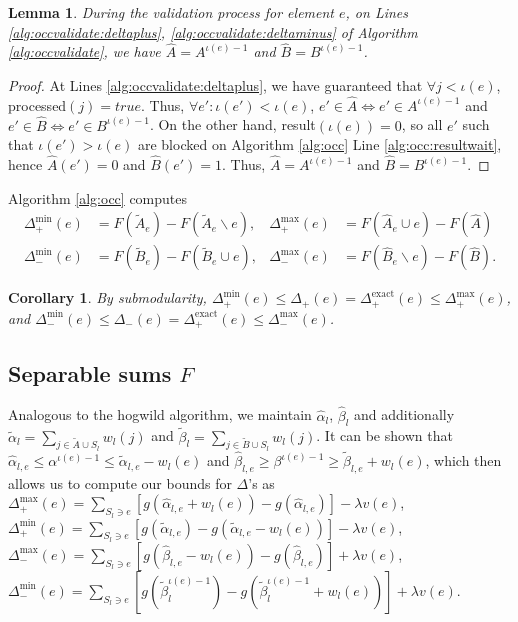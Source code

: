 \documentclass{article} %
\newtheorem{cor}[thm]{Corollary}
\newtheorem{lem}[thm]{Lemma}
\begin{document}
\begin{lem}
During the validation process for element $e$, on Lines \ref{alg:occvalidate:deltaplus}, \ref{alg:occvalidate:deltaminus} of Algorithm \ref{alg:occvalidate}, we have $\hat{A} = A^{\iota(e)-1}$ and $\hat{B} = B^{\iota(e)-1}$.
\end{lem}
\begin{proof}
At Lines \ref{alg:occvalidate:deltaplus}, we have guaranteed that $\forall j < \iota(e)$, processed$(j) = true$.
Thus, $\forall e': \iota(e') < \iota(e)$, $e' \in \hat{A} \iff e' \in A^{\iota(e)-1}$ and $e' \in \hat{B} \iff e' \in B^{\iota(e)-1}$.
On the other hand, result$(\iota(e)) = 0$, so all $e'$ such that $\iota(e') > \iota(e)$ are blocked on Algorithm \ref{alg:occ} Line \ref{alg:occ:resultwait}, hence $\hat{A}(e') = 0$ and $\hat{B}(e') = 1$.
Thus, $\hat{A} = A^{\iota(e)-1}$ and $\hat{B} = B^{\iota(e)-1}$.
\end{proof}

Algorithm \ref{alg:occ} computes
\begin{align*}
  \Delta_+^{\min}(e) &= F(\tilde{A}_e) - F(\tilde{A}_e \backslash e),
& \Delta_+^{\max}(e) &= F(\hat{A}_e \cup e) - F(\hat{A})\\
  \Delta_-^{\min}(e) &= F(\tilde{B}_e) - F(\tilde{B}_e \cup e),
& \Delta_-^{\max}(e) &= F(\hat{B}_e \backslash e) - F(\hat{B}).
\end{align*}

\begin{cor}\label{lem:occdeltas} By submodularity, $\Delta_+^{\min}(e) \leq \Delta_+(e) = \Delta_+^{\text{exact}}(e) \leq \Delta_+^{\max}(e)$, and $\Delta_-^{\min}(e) \leq \Delta_-(e) = \Delta_+^{\text{exact}}(e) \leq \Delta_-^{\max}(e)$.
\end{cor}

\subsection{Separable sums $F$}
Analogous to the hogwild algorithm, we maintain $\hat\alpha_l$, $\hat\beta_l$ and additionally $\tilde\alpha_l = \sum_{j\in \tilde{A}\cup S_l} w_l(j)$ and $\tilde\beta_l = \sum_{j \in \tilde{B}\cup S_l} w_l(j)$.
It can be shown that $\hat\alpha_{l,e} \leq \alpha^{\iota(e)-1} \leq \tilde\alpha_{l,e} - w_l(e)$ and $\hat\beta_{l,e} \geq \beta^{\iota(e)-1} \geq \tilde\beta_{l,e} + w_l(e)$, which then allows us to compute our bounds for $\Delta$'s as
$\Delta_+^{\max}(e) = \sum_{S_l \ni e} \left[g(\hat\alpha_{l,e} + w_l(e)) - g(\hat\alpha_{l,e})\right] - \lambda v(e)$, 
$\Delta_+^{\min}(e) = \sum_{S_l \ni e} \left[g(\tilde\alpha_{l,e}) - g(\tilde\alpha_{l,e} - w_l(e))\right] - \lambda v(e)$,
$\Delta_-^{\max}(e) = \sum_{S_l \ni e} \left[g(\hat\beta_{l,e} - w_l(e)) - g(\hat\beta_{l,e})\right] + \lambda v(e)$,
$\Delta_-^{\min}(e) = \sum_{S_l \ni e} \left[g(\tilde\beta_l^{\iota(e)-1}) - g(\tilde\beta_l^{\iota(e)-1} + w_l(e))\right] + \lambda v(e)$.
\end{document}

